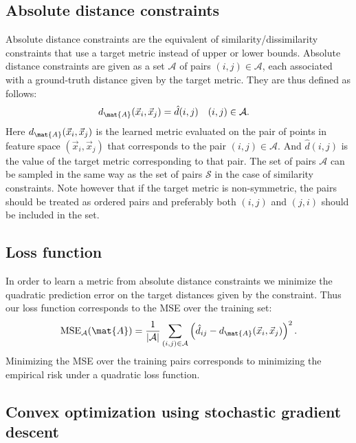 \subsection{Absolute distance constraints}
Absolute distance constraints are the equivalent of similarity/dissimilarity constraints that use a target metric instead of upper or lower bounds.
Absolute distance constraints are given as a set $\mathcal{A}$ of pairs $(i,j) \in \mathcal{A}$, each associated with a ground-truth distance given by the target metric. They are thus defined as follows:
\begin{align}
d_{\mat{A}}(\vec{x}_i, \vec{x}_j) &= \hat{d}(i,j) & (i, j) &\in \mathcal{A}.
\end{align}
Here $d_{\mat{A}}(\vec{x}_i, \vec{x}_j)$ is the learned metric evaluated on the pair of points in feature space $(\vec{x}_i, \vec{x}_j)$ that corresponds to the pair $(i,j) \in \mathcal{A}$.
And $\hat{d}(i,j)$ is the value of the target metric corresponding to that pair.
The set of pairs $\mathcal{A}$ can be sampled in the same way as the set of pairs $\mathcal{S}$ in the case of similarity constraints.
Note however that if the target metric is non-symmetric, the pairs should be treated as ordered pairs and preferably both $(i,j)$ and $(j,i)$ should be included in the set.



\subsection{Loss function}

In order to learn a metric from absolute distance constraints we minimize the quadratic prediction error on the target distances given by the constraint. Thus our loss function corresponds to the \acf{MSE} over the training set:
\begin{equation}
\text{MSE}_\mathcal{A}(\mat{A}) = \frac{1}{|\mathcal{A}|}\sum_{(i,j) \in \mathcal{A}} \left( \hat{d}_{ij} - d_{\mat{A}}(\vec{x}_i, \vec{x}_j) \right)^2.
\label{eq:mse}
\end{equation}
Minimizing the \ac{MSE} over the training pairs corresponds to minimizing the empirical risk under a quadratic loss function.


\subsection{Convex optimization using stochastic gradient descent}

